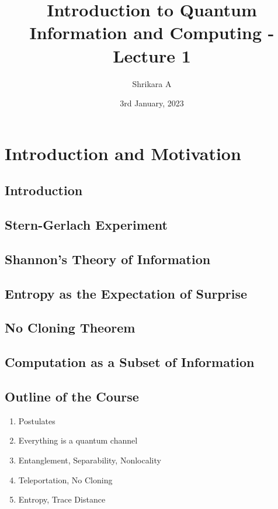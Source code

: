 \documentclass{article}
\title{Introduction to Quantum Information and Computing - Lecture 1}
\author{Shrikara A} %
\date{3rd January, 2023}
\begin{document}
    \maketitle
    \vfill
    \tableofcontents
    \newpage


    \section{Introduction and Motivation}
        \subsection{Introduction}

        \subsection{Stern-Gerlach Experiment}

        \subsection{Shannon's Theory of Information}

        \subsection{Entropy as the Expectation of Surprise}

        \subsection{No Cloning Theorem}

        \subsection{Computation as a Subset of Information}

    \subsection{Outline of the Course}
        \begin{enumerate}
            \item Postulates
            \item Everything is a quantum channel
            \item Entanglement, Separability, Nonlocality
            \item Teleportation, No Cloning
            \item Entropy, Trace Distance
        \end{enumerate}
\end{document}
